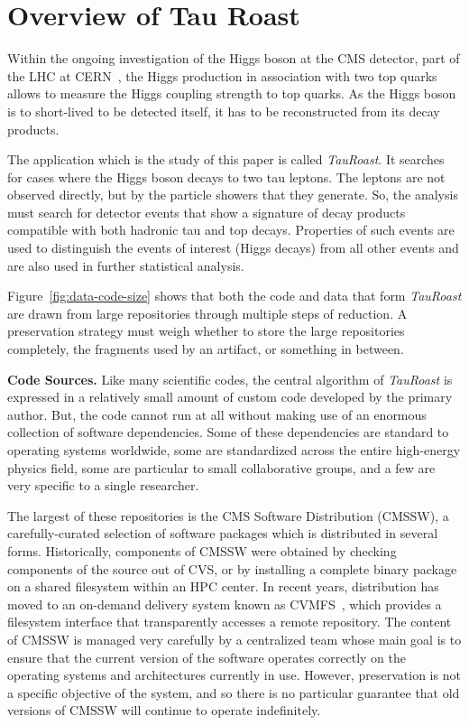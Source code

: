 \documentclass{sig-alternate}
\begin{document}
\section{Overview of Tau Roast}

Within the ongoing investigation of the Higgs boson at the CMS
detector, part of the LHC at CERN~\cite{collaboration2008cms}, the Higgs production in association
with two top quarks allows to measure the Higgs coupling strength to
top quarks.  As the Higgs boson is to short-lived to be detected
itself, it has to be reconstructed from its decay products.

The application which is the study of this paper is called \emph{TauRoast}.
It searches for cases where the Higgs boson decays to two tau leptons.
The leptons are not observed directly, but by the particle showers
that they generate.  So, the analysis must search for detector
events that show a signature of decay products compatible with both hadronic tau and top decays.  Properties of such events are used to distinguish
the events of interest (Higgs decays) from all other events and
are also used in further statistical analysis.

Figure~\ref{fig:data-code-size} shows that both the code and data
that form \emph{TauRoast} are drawn from large repositories through
multiple steps of reduction.  A preservation strategy must weigh
whether to store the large repositories completely, the fragments
used by an artifact, or something in between.

{\bf Code Sources.} Like many scientific codes, the central algorithm
of \emph{TauRoast} is expressed in a relatively small amount of
custom code developed by the primary author.  But, the code cannot
run at all without making use of an enormous collection of software
dependencies.  Some of these dependencies are standard to operating
systems worldwide, some are standardized across the entire high-energy
physics field, some are particular to small collaborative groups,
and a few are very specific to a single researcher.

The largest of these repositories is the CMS Software Distribution (CMSSW),
a carefully-curated selection of software packages which is distributed
in several forms.  Historically, components of CMSSW were obtained by checking components
of the source out of CVS, or by installing a complete binary package on a shared
filesystem within an HPC center.  In recent years, distribution has moved to
an on-demand delivery system known as CVMFS~\cite{blomer2011cernvm}, which
provides a filesystem interface that transparently accesses a remote repository.
The content of CMSSW is managed very carefully by a centralized team whose main goal
is to ensure that the current version of the software operates correctly
on the operating systems and architectures currently in use.  However,
preservation is not a specific objective of the system, and so there is
no particular guarantee that old versions of CMSSW will continue to
operate indefinitely.
\end{document}
